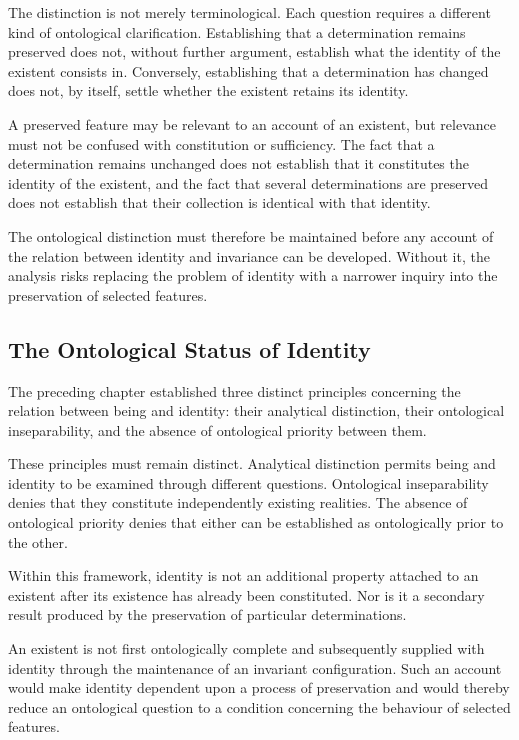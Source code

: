 The distinction is not merely terminological. Each
question requires a different kind of ontological
clarification. Establishing that a determination
remains preserved does not, without further argument,
establish what the identity of the existent consists
in. Conversely, establishing that a determination
has changed does not, by itself, settle whether the
existent retains its identity.

A preserved feature may be relevant to an account
of an existent, but relevance must not be confused
with constitution or sufficiency. The fact that a
determination remains unchanged does not establish
that it constitutes the identity of the existent,
and the fact that several determinations are preserved
does not establish that their collection is identical
with that identity.

The ontological distinction must therefore be maintained
before any account of the relation between identity
and invariance can be developed. Without it, the
analysis risks replacing the problem of identity with
a narrower inquiry into the preservation of selected
features.

\subsection{The Ontological Status of Identity}

The preceding chapter established three distinct
principles concerning the relation between being
and identity: their analytical distinction, their
ontological inseparability, and the absence of
ontological priority between them.

These principles must remain distinct. Analytical
distinction permits being and identity to be examined
through different questions. Ontological inseparability
denies that they constitute independently existing
realities. The absence of ontological priority denies
that either can be established as ontologically
prior to the other.

Within this framework, identity is not an additional
property attached to an existent after its existence
has already been constituted. Nor is it a secondary
result produced by the preservation of particular
determinations.

An existent is not first ontologically complete
and subsequently supplied with identity through
the maintenance of an invariant configuration.
Such an account would make identity dependent upon
a process of preservation and would thereby reduce
an ontological question to a condition concerning
the behaviour of selected features.

